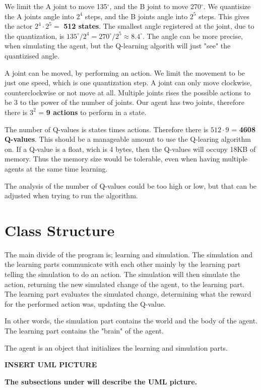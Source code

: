 \documentclass{article}
\begin{document}
We limit the A joint to move 135$^\circ$, and the B joint to move
270$^\circ$. We quantisize the A joints angle into $2^4$ steps, and
the B joints angle into $2^5$ steps. This gives the actor
$2^4 \cdot 2^5 =$ \textbf{512 states}. The smallest angle registered at
the joint, due to the quantization, is
$135^\circ / 2^4 = 270^\circ / 2^5 \approx 8.4^\circ$.
The angle can be more precise, when simulating the agent, but the
Q-learning algorith will just "see" the quantizised angle.

A joint can be moved, by performing an action. We limit the movement to be
just one speed, which is one quantization step. A joint can only move
clockwise, counterclockwise or not move at all. Multiple joints rises the
possible actions to be 3 to the power of the number of joints. Our
agent has two joints, therefore there is $3^2$ = \textbf{9 actions} to
perform in a state.

The number of Q-values is states times actions. Therefore there is
$512 \cdot 9$ = \textbf{4608 Q-values}. This should be a manageable
amount to use the Q-learing algorithm on. If a Q-value is a float,
wich is 4 bytes, then the Q-values will occupy 18KB of memory.
Thus the memory size would be tolerable, even when having multiple agents
at the same time learning.

The analysis of the number of Q-values could be too high or low, but that
can be adjusted when trying to run the algorithm.



\section{Class Structure}
The main divide of the program is; learning and simulation. The
simulation and the learning parts communicate with each other mainly by the
learning part telling the simulation to do an action. The simulation will then
simulate the action, returning the new simulated change of the agent, to the
learning part. The learning part evaluates the simulated change, determining
what the reward for the performed action was, updating the Q-value.

In other words, the simulation part contains the world and the body of the agent.
The learning part contains the "brain" of the agent.

The agent is an object that initializes the learning and simulation parts.

\textbf{INSERT UML PICTURE}

\textbf{The subsections under will describe the UML picture.}
\end{document}

